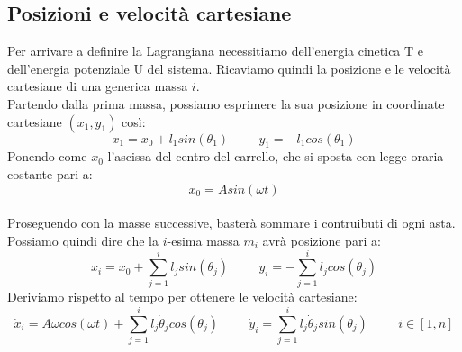 \documentclass[12pt, a4paper] {article}
\begin{document}
\subsection{Posizioni e velocità cartesiane}
Per arrivare a definire la Lagrangiana necessitiamo dell'energia cinetica T e dell'energia potenziale U del sistema. Ricaviamo quindi la posizione e le velocità cartesiane di una generica massa $i$.\\
Partendo dalla prima massa, possiamo esprimere la sua posizione in coordinate cartesiane $(x_1,y_1)$ così:
\[ x_1=x_0+l_1sin(\theta_1)\hspace{1cm}y_1=-l_1cos(\theta_1)\]
Ponendo come $x_0$ l'ascissa del centro del carrello, che si sposta con legge oraria costante pari a:\[x_0=Asin(\omega t)\]
\\
Proseguendo con la masse successive, basterà sommare i contruibuti di ogni asta. Possiamo quindi dire che la $i$-esima massa $m_i$ avrà posizione pari a:\[x_i=x_0+\sum_{j=1}^{i}l_jsin(\theta_j)\hspace{1cm}y_i=-\sum_{j=1}^{i}l_jcos(\theta_j)\]
Deriviamo rispetto al tempo per ottenere le velocità cartesiane:\[\dot x_i=A\omega cos(\omega t)+\sum_{j=1}^{i} l_j\dot\theta_j cos(\theta_j)\hspace{1cm}\dot y_i=\sum_{j=1}^{i}l_j\dot\theta_j sin(\theta_j)\hspace{1cm}i\in[1,n]\]
\end{document}
